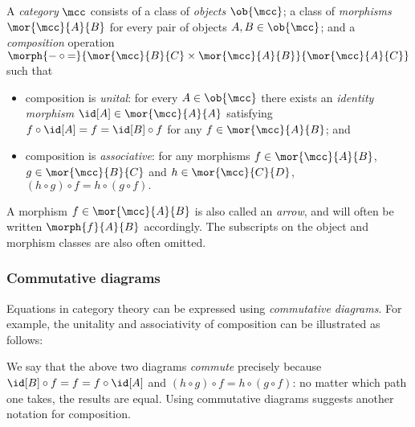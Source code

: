 \begin{definition}[Categories]
    \label{def:category}
    A \emph{category} \(\mcc\) consists of a class of \emph{objects}
    \(\ob{\mcc}\); a class of \emph{morphisms} \(\mor{\mcc}{A}{B}\)
    for every pair of objects \(A, B \in \ob{\mcc}\); and a \emph{composition}
    operation \(
        \morph{
            {-} \circ {=}
        }{
            \mor{\mcc}{B}{C} \times \mor{\mcc}{A}{B}
        }{
            \mor{\mcc}{A}{C}
        }
    \) such that
    \begin{itemize}
        \item composition is \emph{unital}: for every \(
                    A \in \ob{\mcc}
                \) there exists an \emph{identity morphism} \(
                    \id[A] \in \mor{\mcc}{A}{A}
                \) satisfying \(
                    f \circ \id[A] = f = \id[B] \circ f
                \) for any \(
                    f \in \mor{\mcc}{A}{B}
                \); and
        \item composition is \emph{associative}: for any morphisms \(
                    f \in \mor{\mcc}{A}{B}
                \), \(
                    g \in \mor{\mcc}{B}{C}
                \) and \(h \in \mor{\mcc}{C}{D}\), \(
                    (h \circ g) \circ f = h \circ (g \circ f).
                \)
    \end{itemize}
\end{definition}

A morphism \(f \in \mor{\mcc}{A}{B}\) is also called an \emph{arrow}, and will
often be written \(\morph{f}{A}{B}\) accordingly.
The subscripts on the object and morphism classes are also often omitted.

\subsubsection{Commutative diagrams}

Equations in category theory can be expressed using \emph{commutative diagrams}.
For example, the unitality and associativity of composition can be illustrated
as follows:

\begin{center}
    
    \quad
    
\end{center}

We say that the above two diagrams \emph{commute} precisely because \(
    \id[B] \circ f = f = f \circ \id[A]
\) and \((h \circ g) \circ f = h \circ (g \circ f)\): no matter which path one
takes, the results are equal.
Using commutative diagrams suggests another notation for composition.

